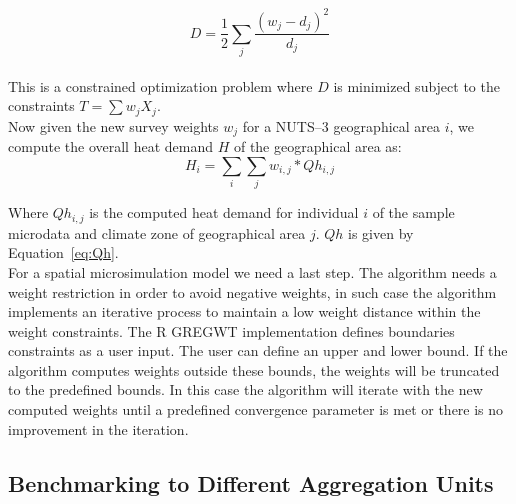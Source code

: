 \documentclass[runningheads,a4paper]{llncs}
\begin{document}
\begin{equation} \label{eq:distance}
    D = \frac{1}{2} \sum_j \frac{{\left(w_j - d_j \right)}^2}{d_j}
\end{equation}
\\

%

This is a constrained optimization problem where $D$ is minimized subject to
the constraints $T = \sum w_j X_j$.
\\

Now given the new survey weights $w_j$ for a NUTS--3 geographical area $i$, we
compute the overall heat demand $H$ of the geographical area as:
\\

\begin{equation}
    H_i = \sum_i \sum_j w_{i,j} * Qh_{i,j}
\end{equation}

Where $Qh_{i,j}$ is the computed heat demand for individual $i$ of the sample
microdata and climate zone of geographical area $j$.
$Qh$ is given by Equation~\ref{eq:Qh}.
\\

For a spatial microsimulation model we need a last step. The algorithm needs a
weight restriction in order to avoid negative weights, in such case the algorithm
implements an iterative process to maintain a low weight distance within the
weight constraints. The R GREGWT implementation defines boundaries constraints as
a user input. The user can define an upper and lower bound. If the algorithm
computes weights outside these bounds, the weights will be truncated to the
predefined bounds. In this case the algorithm will iterate with the new computed
weights until a predefined convergence parameter is met or there is no
improvement in the iteration.
\\

\subsection{Benchmarking to Different Aggregation Units}\label{sec:bench}
\end{document}
